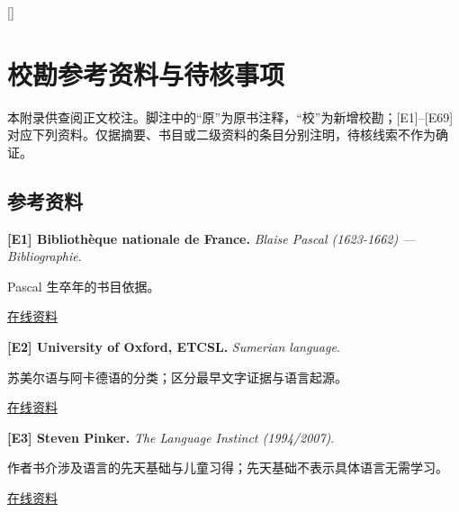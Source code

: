 [\vspace{1.2ex}\titlerule]
\chapter{校勘参考资料与待核事项}
本附录供查阅正文校注。脚注中的“原”为原书注释，“校”为新增校勘；[E1]–[E69] 对应下列资料。仅据摘要、书目或二级资料的条目分别注明，待核线索不作为确证。

\section*{参考资料}
\begingroup
\small{}\setlength{\parindent}{0pt}\setlength{\parskip}{.38em}
\par\noindent\begin{minipage}{\linewidth}
\label{ref-1}\noindent\textbf{[E1] Bibliothèque nationale de France.} \textit{Blaise Pascal (1623-1662) — Bibliographie}.\par\nobreak
Pascal 生卒年的书目依据。\par
{\small\href{https://www.bnf.fr/fr/blaise-pascal-1623-1662-bibliographie}{在线资料}}\par
\par\end{minipage}\par

\par\noindent\begin{minipage}{\linewidth}
\label{ref-2}\noindent\textbf{[E2] University of Oxford, ETCSL.} \textit{Sumerian language}.\par\nobreak
苏美尔语与阿卡德语的分类；区分最早文字证据与语言起源。\par
{\small\href{https://etcsl.orinst.ox.ac.uk/edition2/language.php}{在线资料}}\par
\par\end{minipage}\par

\par\noindent\begin{minipage}{\linewidth}
\label{ref-3}\noindent\textbf{[E3] Steven Pinker.} \textit{The Language Instinct (1994/2007)}.\par\nobreak
作者书介涉及语言的先天基础与儿童习得；先天基础不表示具体语言无需学习。\par
{\small\href{https://stevenpinker.com/publications/language-instinct-19942007}{在线资料}}\par
\par\end{minipage}\par

